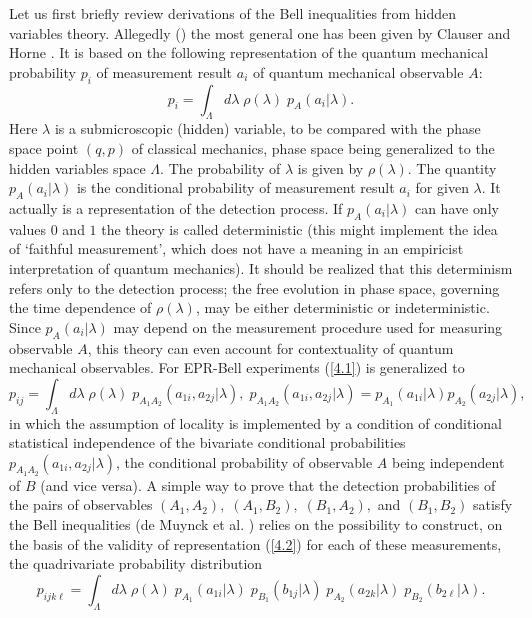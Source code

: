 \documentclass[12pt]{article}
\begin{document}
Let us first briefly review derivations of the Bell inequalities
from hidden variables theory. Allegedly (\cite{Eber78}) the most
general one has been given by Clauser and Horne \cite{ClH74}. It
is based on the following representation of the quantum mechanical
probability $p_i$ of measurement result $a_i$ of quantum
mechanical observable $A$:
\begin{equation}\label{4.1}
p_i=\int_\Lambda d\lambda\;\rho(\lambda)\;p_A(a_i|\lambda).
\end{equation}
Here $\lambda$ is a submicroscopic (hidden) variable, to be
compared with the phase space point $(q,p)$ of classical
mechanics, phase space being generalized to the hidden variables
space $\Lambda$. The probability of $\lambda$ is given by
$\rho(\lambda)$. The quantity $p_A(a_i|\lambda)$ is the
conditional probability of measurement result $a_i$ for given
$\lambda$. It actually is a representation of the detection
process. If $p_A(a_i|\lambda)$ can have only values $0$ and $1$
the theory is called deterministic (this might implement the idea
of `faithful measurement', which does not have a meaning in an
empiricist interpretation of quantum mechanics). It should be
realized that this determinism refers only to the detection
process; the free evolution in phase space, governing the time
dependence of $\rho(\lambda)$, may be either deterministic or
indeterministic. Since $p_A(a_i|\lambda)$ may depend on the
measurement procedure used for measuring observable $A$, this
theory can even account for contextuality of quantum mechanical
observables. For EPR-Bell experiments (\ref{4.1}) is generalized
to
\begin{equation}\label{4.2}
  p_{ij}=\int_\Lambda d\lambda\;\rho(\lambda)\;p_{A_1A_2}(a_{1i},a_{2j}|\lambda),\;
  p_{A_1A_2}(a_{1i},a_{2j}|\lambda)=p_{A_1}(a_{1i}|\lambda)p_{A_2}(a_{2j}|\lambda),
\end{equation}
in which the assumption of locality is implemented by a condition
of conditional statistical independence of the bivariate
conditional probabilities $p_{A_1A_2}(a_{1i},a_{2j}|\lambda)$, the
conditional probability of observable $A$ being independent of $B$
(and vice versa). A simple way to prove that the detection
probabilities of the pairs of observables
$(A_1,A_2),\;(A_1,B_2),\;(B_1,A_2),$ and $(B_1,B_2)$ satisfy the
Bell inequalities (de Muynck et al. \cite{dMDBMa95}) relies on the
possibility to construct, on the basis of the validity of
representation (\ref{4.2}) for each of these measurements, the
quadrivariate probability distribution
\begin{equation}\label{4.2.2}
p_{ijk\ell}=\int_\Lambda d\lambda\;
\rho(\lambda)\;p_{A_1}(a_{1i}|\lambda)\;p_{B_1}(b_{1j}|\lambda)\;
p_{A_2}(a_{2k}|\lambda)\;p_{B_2}(b_{2\ell}|\lambda).
\end{equation}
\end{document}
